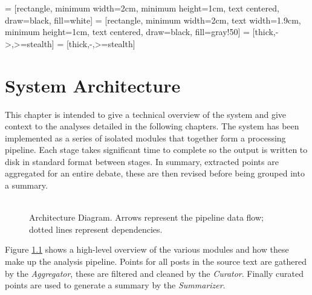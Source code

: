  = [rectangle, minimum width=2cm, minimum height=1cm, text centered, draw=black, fill=white]
 = [rectangle, minimum width=2cm, text width=1.9cm, minimum height=1cm, text centered, draw=black, fill=gray!50]
 = [thick,->,>=stealth]
 = [thick,-,>=stealth]

\chapter{System Architecture\label{chap:system-architecture}}
  This chapter is intended to give a technical overview of the system and give context to the analyses detailed in the following chapters. The system has been implemented as a series of isolated modules that together form a processing pipeline. Each stage takes significant time to complete so the output is written to disk in standard format between stages. In summary, extracted points are aggregated for an entire debate, these are then revised before being grouped into a summary.

  \begin{figure}[!h]
    \centering
    \caption{\\Architecture Diagram. Arrows represent the pipeline data flow; dotted lines represent dependencies.}
    \label{fig:arch-dia}
  \end{figure}

  Figure \ref{fig:arch-dia} shows a high-level overview of the various modules and how these make up the analysis pipeline. Points for all posts in the source text are gathered by the \textit{Aggregator}, these are filtered and cleaned by the \textit{Curator}. Finally curated points are used to generate a summary by the \textit{Summarizer}.

